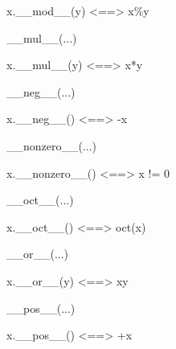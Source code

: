 \documentclass[letterpaper,10pt,english]{sphinxmanual}
\begin{document}
\begin{description}
\begin{description}
\begin{DUlineblock}{0em}
\item[]
\begin{DUlineblock}{\DUlineblockindent}
\item[] x.\_\_mod\_\_(y) \textless{}==\textgreater{} x\%y
\item[] 
\end{DUlineblock}
\item[] \_\_mul\_\_(...)
\item[]
\begin{DUlineblock}{\DUlineblockindent}
\item[] x.\_\_mul\_\_(y) \textless{}==\textgreater{} x*y
\item[] 
\end{DUlineblock}
\item[] \_\_neg\_\_(...)
\item[]
\begin{DUlineblock}{\DUlineblockindent}
\item[] x.\_\_neg\_\_() \textless{}==\textgreater{} -x
\item[] 
\end{DUlineblock}
\item[] \_\_nonzero\_\_(...)
\item[]
\begin{DUlineblock}{\DUlineblockindent}
\item[] x.\_\_nonzero\_\_() \textless{}==\textgreater{} x != 0
\item[] 
\end{DUlineblock}
\item[] \_\_oct\_\_(...)
\item[]
\begin{DUlineblock}{\DUlineblockindent}
\item[] x.\_\_oct\_\_() \textless{}==\textgreater{} oct(x)
\item[] 
\end{DUlineblock}
\item[] \_\_or\_\_(...)
\item[]
\begin{DUlineblock}{\DUlineblockindent}
\item[] x.\_\_or\_\_(y) \textless{}==\textgreater{} x\textbar{}y
\item[] 
\end{DUlineblock}
\item[] \_\_pos\_\_(...)
\item[]
\begin{DUlineblock}{\DUlineblockindent}
\item[] x.\_\_pos\_\_() \textless{}==\textgreater{} +x

\end{DUlineblock}
\end{DUlineblock}
\end{description}
\end{description}
\end{document}
